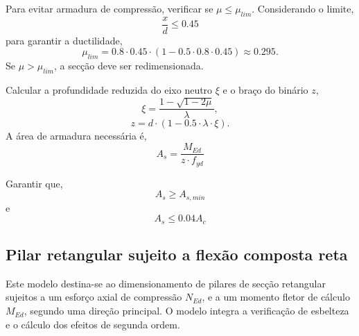 Para evitar armadura de compressão, verificar se $\mu \le \mu_{lim}$. Considerando o limite,
\begin{equation}
    \frac{x}{d} \le 0.45
\end{equation}
para garantir a ductilidade,
\begin{equation}
    \mu_{lim} = 0.8 \cdot 0.45 \cdot (1 - 0.5 \cdot 0.8 \cdot 0.45) \approx 0.295.
\end{equation}
Se $\mu > \mu_{lim}$, a secção deve ser redimensionada.

Calcular a profundidade reduzida do eixo neutro $\xi$ e o braço do binário $z$,
\begin{equation}
    \xi = \frac{1 - \sqrt{1 - 2\mu}}{\lambda},
\end{equation}
\begin{equation}
    z = d \cdot (1 - 0.5 \cdot \lambda \cdot \xi).
\end{equation}
A área de armadura necessária é,
\begin{equation}
    A_s = \frac{M_{Ed}}{z \cdot f_{yd}}
\end{equation}

Garantir que,
\begin{equation}
    A_{s} \ge A_{s,min}
\end{equation}
e
\begin{equation}
    A_{s} \le 0.04 A_c
\end{equation}

\subsection{Pilar retangular sujeito a flexão composta reta}
Este modelo destina-se ao dimensionamento de pilares de secção retangular sujeitos a um esforço axial de compressão $N_{Ed}$, e a um momento fletor de cálculo $M_{Ed}$, segundo uma direção principal. O modelo integra a verificação de esbelteza e o cálculo dos efeitos de segunda ordem.

